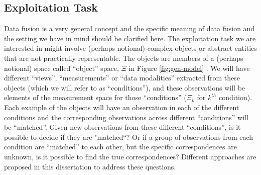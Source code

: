 \documentclass[12pt,oneside,final]{thesis}\usepackage[]{graphicx}\usepackage[]{color}
\begin{document}
\subsection{Exploitation Task}
Data fusion is a very general concept and the specific meaning of data fusion and the setting we have in mind should be clarified here. The exploitation task we are interested in might involve (perhaps notional) complex objects or abstract entities that are not practically representable. The objects are members of a (perhaps notional) space called ``object'' space, $\Xi$ in Figure \ref{fig:gen-model} . We will have different ``views'', ``measurements'' or ``data modalities'' extracted from these objects (which we will refer to as ``conditions''), and these observations will be elements of the measurement space for those ``conditions'' ($\Xi_k$ for $k^{th}$ condition). Each example of the objects will have an observation in each of the different conditions and the corresponding observations across different ``conditions'' will be ``matched''. Given new observations from these different ``conditions'', is it possible to decide if they are "matched``? Or if a group of  observations from each condition are ``matched'' to each other, but the specific correspondences are unknown, is it possible to find the true correspondences? Different approaches are proposed in this dissertation to address these questions.
\label{subsec:task}
\end{document}
